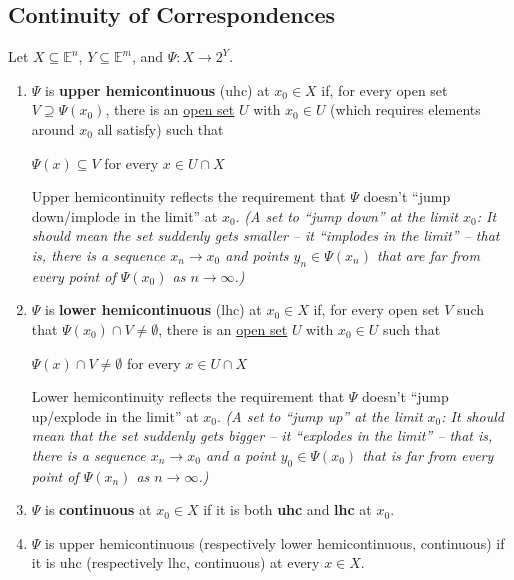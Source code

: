 \documentclass[11pt]{elegantbook}
\begin{document}
\subsection{Continuity of Correspondences}
\begin{definition}
    \normalfont
    Let $X\subseteq \mathbb{E}^n$, $Y\subseteq \mathbb{E}^m$, and $\Psi: X \rightarrow 2^Y$.
    \begin{enumerate}
        \item $\Psi$ is \textbf{upper hemicontinuous} (uhc) at $x_0 \in X$ if, for every open set $V \supseteq \Psi(x_0)$, there is an \underline{open set} $U$ with $x_0 \in U$ (which requires elements around $x_0$ all satisfy) such that
        \begin{center}
            $\Psi(x) \subseteq V$ for every $x \in U \cap X$
        \end{center}
        Upper hemicontinuity reflects the requirement that $\Psi$ doesn't “jump down/implode in the limit” at $x_0$. \textit{(A set to “jump down” at the limit $x_0$: It should mean the set suddenly gets smaller -- it “implodes in the limit” -- that is, there is a sequence $x_n \rightarrow x_0$ and points $y_n \in \Psi(x_n)$ that are far from every point of $\Psi(x_0)$ as $n \rightarrow \infty$.)}
        \item $\Psi$ is \textbf{lower hemicontinuous} (lhc) at $x_0 \in X$ if, for every open set $V$ such that $\Psi(x_0)\cap V \neq \emptyset$, there is an \underline{open set} $U$ with $x_0 \in U$ such that
        \begin{center}
            $\Psi(x) \cap V\neq \emptyset$ for every $x \in U \cap X$
        \end{center}
        Lower hemicontinuity reflects the requirement that $\Psi$ doesn't “jump up/explode in the limit” at $x_0$. \textit{(A set to “jump up” at the limit $x_0$: It should mean that the set suddenly gets bigger -- it “explodes in the limit” -- that is, there is a sequence $x_n \rightarrow x_0$ and a point $y_0\in\Psi(x_0)$ that is far from every point of $\Psi(x_n)$ as $n \rightarrow \infty$.)}
        \item $\Psi$ is \textbf{continuous} at $x_0 \in X$ if it is both \textbf{uhc} and \textbf{lhc} at $x_0$.
        \item $\Psi$ is upper hemicontinuous (respectively lower hemicontinuous, continuous) if it is uhc (respectively lhc, continuous) at every $x \in X$.
    \end{enumerate}
\end{definition}
\end{document}
